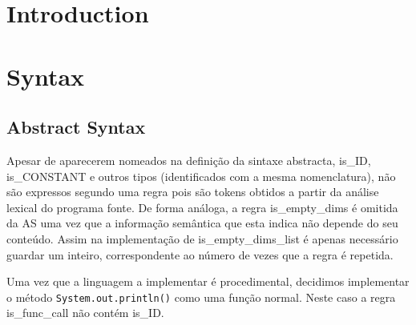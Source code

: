 \documentclass[a4paper]{article}
\title{\documentTitle}
\author{\documentAuthors{}}
\begin{document}
\renewcommand{\figurename}{Figure}
\maketitle
\cleardoublepage

\tableofcontents
\cleardoublepage

\setlength{\parindent}{1cm}
\setlength{\parskip}{0.3cm}

\section{Introduction}

\section {Syntax}
\subsection{Abstract Syntax}
\indent \indent Apesar de aparecerem nomeados na definição da sintaxe abstracta, is\_ID, \\
is\_CONSTANT e outros tipos (identificados com a mesma nomenclatura),
não são expressos segundo uma regra pois são tokens obtidos a partir da análise lexical do programa fonte.
De forma análoga, a regra is\_empty\_dims é omitida da AS uma vez que a informação semântica que esta indica não depende do seu conteúdo.
Assim na implementação de is\_empty\_dims\_list é apenas necessário guardar um inteiro, correspondente ao número de vezes que a regra é repetida.

Uma vez que a linguagem a implementar é procedimental, decidimos implementar o método \texttt{System.out.println()} como uma função normal.
Neste caso a regra is\_func\_call não contém is\_ID. 
\end{document}
